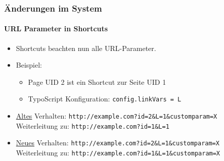 \begin{frame}[fragile]
	\frametitle{Änderungen im System}
	\framesubtitle{URL Parameter in Shortcuts}

	\begin{itemize}
		\item Shortcuts beachten nun alle URL-Parameter.
		\item Beispiel:

			\begin{itemize}
				\item Page UID 2 ist ein Shortcut zur Seite UID 1
				\item TypoScript Konfiguration: \texttt{config.linkVars = L}
			\end{itemize}

		\item \underline{Altes} Verhalten:\newline
			\smaller
				\tabto{0.5cm}\texttt{http://example.com?id=2\&L=1\&customparam=X}\newline
				Weiterleitung zu:\newline
				\tabto{0.5cm}\texttt{http://example.com?id=1\&L=1}
			\normalsize

		\item \underline{Neues} Verhalten:\newline
			\smaller
				\tabto{0.5cm}\texttt{http://example.com?id=2\&L=1\&customparam=X}\newline
				Weiterleitung zu:\newline
				\tabto{0.5cm}\texttt{http://example.com?id=1\&L=1\&customparam=X}
			\normalsize

	\end{itemize}

\end{frame}



